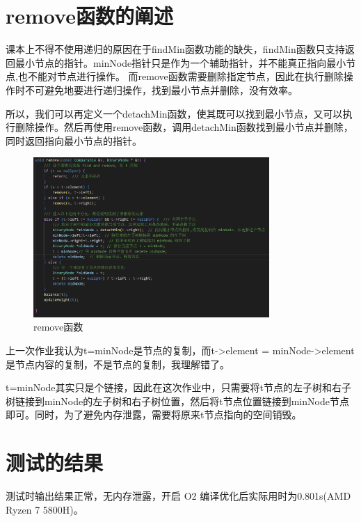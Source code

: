 \documentclass[UTF8]{ctexart}
\begin{document}
\pagestyle{fancy}
\fancyhead{}

\section{remove函数的阐述}
    课本上不得不使用递归的原因在于findMin函数功能的缺失，findMin函数只支持返回最小节点的指针。minNode指针只是作为一个辅助指针，并不能真正指向最小节点,也不能对节点进行操作。
    而remove函数需要删除指定节点，因此在执行删除操作时不可避免地要进行递归操作，找到最小节点并删除，没有效率。
     
    所以，我们可以再定义一个detachMin函数，使其既可以找到最小节点，又可以执行删除操作。然后再使用remove函数，调用detachMin函数找到最小节点并删除，同时返回指向最小节点的指针。
    \begin{figure}[htbp] %
        \centering
        \includegraphics[width=0.8\textwidth]{remove.png} %
        \caption{remove函数} %
        \label{1} %
    \end{figure}
    
    上一次作业我认为t=minNode是节点的复制，而t->element = minNode->element是节点内容的复制，不是节点的复制，我理解错了。

    t=minNode其实只是个链接，因此在这次作业中，只需要将t节点的左子树和右子树链接到minNode的左子树和右子树位置，然后将t节点位置链接到minNode节点即可。同时，为了避免内存泄露，需要将原来t节点指向的空间销毁。

\section{测试的结果}   
 
    测试时输出结果正常，无内存泄露，开启 O2 编译优化后实际用时为0.801s(AMD Ryzen 7 5800H)。
\end{document}
